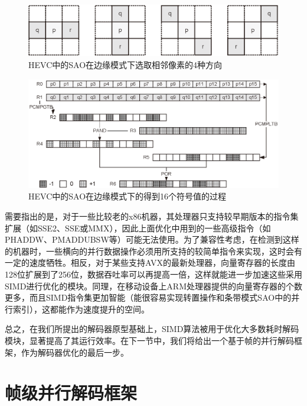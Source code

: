 \begin{figure}[!tp]
	\centering
	\includegraphics[width = 0.9\linewidth]{eps/SAO_edge_direction}
	\caption{\label{fig:SAO_edge_direction}HEVC中的SAO在边缘模式下选取相邻像素的4种方向}
\end{figure}

\begin{figure}[!tp]
	\centering
	\includegraphics[width = 0.95\linewidth]{eps/SAO_edge_parallel_index}
	\caption{\label{fig:SAO_edge_parallel_index}HEVC中的SAO在边缘模式下的得到16个符号值的过程}
\end{figure}


需要指出的是，对于一些比较老的x86机器，其处理器只支持较早期版本的指令集扩展（如SSE2、SSE或MMX），因此上面优化中用到的一些高级指令（如PHADDW、PMADDUBSW等）可能无法使用。为了兼容性考虑，在检测到这样的机器时，一些横向的并行数据操作必须用所支持的较简单指令来实现，这时会有一定的速度牺牲。相反，对于某些支持AVX的最新处理器，向量寄存器的长度由128位扩展到了256位，数据吞吐率可以再提高一倍，这样就能进一步加速这些采用SIMD进行优化的模块。同理，在移动设备上ARM处理器提供的向量寄存器的个数更多，而且SIMD指令集更加智能（能很容易实现转置操作和条带模式SAO中的并行索引），这都能作为速度提升的空间。

总之，在我们所提出的解码器原型基础上，SIMD算法被用于优化大多数耗时解码模块，显著提高了其运行效率。在下一节中，我们将给出一个基于帧的并行解码框架，作为解码器优化的最后一步。

\section{帧级并行解码框架}

